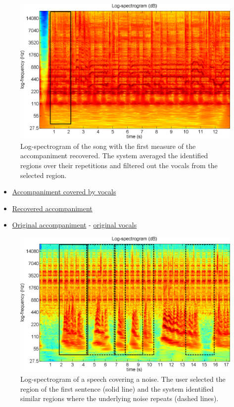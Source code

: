 \documentclass{article}
\begin{document}
\begin{figure}[!htb]
\centering
\includegraphics[width=\columnwidth]{Images/urepet_example2b.png}
\caption{Log-spectrogram of the song with the first measure of the accompaniment recovered. The system averaged the identified regions over their repetitions and filtered out the vocals from the selected region.}
\label{fig:urepet_example2b}
\end{figure}

\begin{itemize}[noitemsep,topsep=0pt]
\item \href{Audio/uREPET/accompaniment&vocals.wav}{Accompaniment covered by vocals}
\item \href{Audio/uREPET/accompaniment-vocals.wav}{Recovered accompaniment}
\item \href{Audio/uREPET/accompaniment.wav}{Original accompaniment} - \href{Audio/REPET/vocals.wav}{original vocals}
\end{itemize}

\begin{figure}[!htb]
\centering
\includegraphics[width=\columnwidth]{Images/urepet_example3a.png}
\caption{Log-spectrogram of a speech covering a noise. The user selected the region of the first sentence (solid line) and the system identified similar regions where the underlying noise repeats (dashed lines).}
\label{fig:urepet_example3a}
\end{figure}
\end{document}
